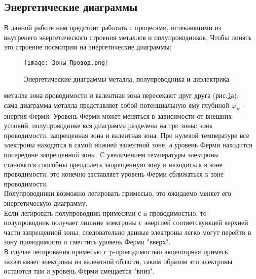 \documentclass[12pt,a4paper]{article}
\begin{document}
\subsection{Энергетические диаграммы}
В данной работе нам предстоит работать с процесами, истекающими из внутренего энергетического строения металлов и полупроводников. Чтобы понять это строение посмотрим на энергетические диаграммы:
\begin{figure}[h!]
    \centering
    \texttt{[image: Зоны\_Провод.png]}
        \caption{Энергетические диаграммы металла, полупроводника и диэлектрика}
    \label{1}
\end{figure}
\begin{itemize}
     металле зона проводимости и валентная зона пересекают друг друга (рис.\ref{1}а), сама диаграмма металла представляет собой потенциальную яму глубиной $\varphi_F$ - энергия Ферми. Уровень Ферми может меняться в зависимости от внешних условий.
     полупроводнике вся диаграмма разделена на три зоны: зона проводимости, запрещенная зона и валентная зона. При нулевой температуре все электроны находятся в самой нижней валентной зоне, а уровень Ферми находится посередине запрещенной зоны. С увеличением температуры электроны становятся способны преодолеть запрещенную зону и находиться в зоне проводимости, это конечно заставляет уровень Ферми сближаться к зоне проводимости.\\
Полупроводники возможно легировать примесью, это ожидаемо меняет его энергетическую диаграмму.\\
Если легировать полупроводник примесями с n-проводимостью, то полупроводник получает лишние электроны с энергией соответсвующей верхней части запрещенной зоны, следовательно данные электроны легко могут перейти в зону проводимости и сместить уровень Ферми "вверх".\\
В случае легирования примесью с p-проводимостью акцепторная примесь захватывает электроны из валентной области, таким образом эти электроны остаются там и уровень Ферми смещается "вниз".

\end{itemize}
\end{document}
